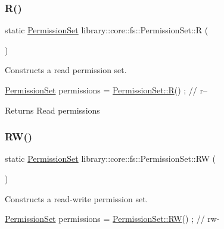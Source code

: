 \subsubsection{\texorpdfstring{R()}{R()}}
{\footnotesize\ttfamily static \hyperlink{classlibrary_1_1core_1_1fs_1_1_permission_set}{Permission\+Set} library\+::core\+::fs\+::\+Permission\+Set\+::R (\begin{DoxyParamCaption}{ }\end{DoxyParamCaption})\hspace{0.3cm}{\ttfamily [static]}}



Constructs a read permission set. 


\begin{DoxyCode}
\hyperlink{classlibrary_1_1core_1_1fs_1_1_permission_set_a8a6eb39cc2a8bca92a657d065d3e36ba}{PermissionSet} permissions = \hyperlink{classlibrary_1_1core_1_1fs_1_1_permission_set_a48d447273c118d6a7c81aebb505189c6}{PermissionSet::R}() ; \textcolor{comment}{// r--}
\end{DoxyCode}


\begin{DoxyReturn}{Returns}
Read permissions 
\end{DoxyReturn}
\mbox{\label{classlibrary_1_1core_1_1fs_1_1_permission_set_a9722204cdc11a0171e1a115d449a134b}} 
\subsubsection{\texorpdfstring{R\+W()}{RW()}}
{\footnotesize\ttfamily static \hyperlink{classlibrary_1_1core_1_1fs_1_1_permission_set}{Permission\+Set} library\+::core\+::fs\+::\+Permission\+Set\+::\+RW (\begin{DoxyParamCaption}{ }\end{DoxyParamCaption})\hspace{0.3cm}{\ttfamily [static]}}



Constructs a read-\/write permission set. 


\begin{DoxyCode}
\hyperlink{classlibrary_1_1core_1_1fs_1_1_permission_set_a8a6eb39cc2a8bca92a657d065d3e36ba}{PermissionSet} permissions = \hyperlink{classlibrary_1_1core_1_1fs_1_1_permission_set_a9722204cdc11a0171e1a115d449a134b}{PermissionSet::RW}() ; \textcolor{comment}{// rw-}
\end{DoxyCode}


